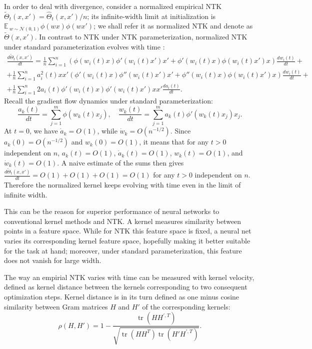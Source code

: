 \documentclass{article}
\newcommand{\EE}{\mathbb{E}\,}
\newcommand{\NN}{\mathcal{N}}
\DeclareMathOperator*{\tr}{tr}
\begin{document}
    In order to deal with divergence, consider a normalized empirical NTK $\tilde\Theta_t(x,x') = \hat\Theta_t(x,x') / n$; its infinite-width limit at initialization is $\EE_{w \sim \NN(0,1)} \phi(w x) \phi(w x')$; we shall refer it as normalized NTK and denote as $\tilde\Theta(x,x')$.
    In contrast to NTK under NTK parameterization, normalized NTK under standard parameterization evolves with time \cite{golikov2020dynamically}:
    \begin{multline}
        \frac{d\tilde\Theta_t(x,x')}{dt}
        = \frac{1}{n} \sum_{i=1}^n \left(\phi(w_i(t) x) \phi'(w_i(t) x') x' + \phi'(w_i(t) x) \phi(w_i(t) x') x\right) \frac{dw_i(t)}{dt} 
        +\\+ \frac{1}{n} \sum_{i=1}^n a_i^2(t) x x' \left(\phi'(w_i(t) x) \phi''(w_i(t) x') x' + \phi''(w_i(t) x) \phi(w_i(t) x') x\right) \frac{dw_i(t)}{dt}
        +\\+ \frac{1}{n} \sum_{i=1}^n 2 a_i(t) \phi'(w_i(t) x) \phi'(w_i(t) x') x x' \frac{da_i(t)}{dt}.
    \end{multline}
    Recall the gradient flow dynamics under standard parameterization:
    \begin{equation}
        \frac{a_k(t)}{dt} 
        = \sum_{j=1}^m \phi(w_k(t) x_j),
        \quad
        \frac{w_k(t)}{dt} 
        = \sum_{j=1}^m a_k(t) \phi'(w_k(t) x_j) x_j.
    \end{equation}
    At $t=0$, we have $\dot a_k = O(1)$, while $\dot w_k = O(n^{-1/2})$.
    Since $a_k(0) = O(n^{-1/2})$ and $w_k(0) = O(1)$, it means that for any $t > 0$ independent on $n$, $a_k(t) = O(1)$, $\dot a_k(t) = O(1)$, $w_k(t) = O(1)$, and $\dot w_k(t) = O(1)$.
    A naive estimate of the sums then gives $\frac{d\tilde\Theta_t(x,x')}{dt} = O(1) + O(1) + O(1) = O(1)$ for any $t > 0$ independent on $n$.
    Therefore the normalized kernel keeps evolving with time even in the limit of infinite width.
    
    This can be the reason for superior performance of neural networks to conventional kernel methods and NTK.
    A kernel measures similarity between points in a feature space.
    While for NTK this feature space is fixed, a neural net varies its corresponding kernel feature space, hopefully making it better suitable for the task at hand; moreover, under standard parameterization, this feature does not vanish for large width.

    The way an empirial NTK varies with time can be measured with kernel velocity, defined as kernel distance between the kernels corresponding to two consequent optimization steps.
    Kernel distance is in its turn defined as one minus cosine similarity between Gram matrices $H$ and $H'$ of the corresponding kernels:
    \begin{equation}
        \rho(H, H') = 1 - \frac{\tr(H H^{\prime,T})}{\sqrt{\tr(H H^T) \tr(H' H^{\prime,T})}}.
    \end{equation}
\end{document}

